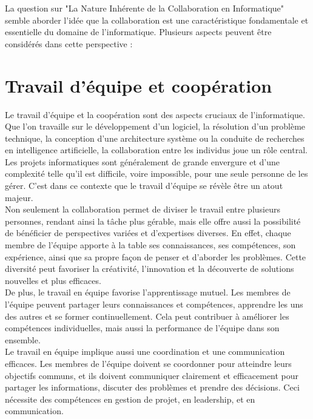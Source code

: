La question sur "La Nature Inhérente de la Collaboration en Informatique" semble aborder l'idée que la collaboration est une caractéristique fondamentale et essentielle du domaine de l'informatique. Plusieurs aspects peuvent être considérés dans cette perspective :

\section{Travail d'équipe et coopération} 
Le travail d'équipe et la coopération sont des aspects cruciaux de l'informatique. Que l'on travaille sur le développement d'un logiciel, la résolution d'un problème technique, la conception d'une architecture système ou la conduite de recherches en intelligence artificielle, la collaboration entre les individus joue un rôle central. \\

Les projets informatiques sont généralement de grande envergure et d'une complexité telle qu'il est difficile, voire impossible, pour une seule personne de les gérer. C'est dans ce contexte que le travail d'équipe se révèle être un atout majeur. \\

Non seulement la collaboration permet de diviser le travail entre plusieurs personnes, rendant ainsi la tâche plus gérable, mais elle offre aussi la possibilité de bénéficier de perspectives variées et d'expertises diverses. En effet, chaque membre de l'équipe apporte à la table ses connaissances, ses compétences, son expérience, ainsi que sa propre façon de penser et d'aborder les problèmes. Cette diversité peut favoriser la créativité, l'innovation et la découverte de solutions nouvelles et plus efficaces.\\

De plus, le travail en équipe favorise l'apprentissage mutuel. Les membres de l'équipe peuvent partager leurs connaissances et compétences, apprendre les uns des autres et se former continuellement. Cela peut contribuer à améliorer les compétences individuelles, mais aussi la performance de l'équipe dans son ensemble.\\

Le travail en équipe implique aussi une coordination et une communication efficaces. Les membres de l'équipe doivent se coordonner pour atteindre leurs objectifs communs, et ils doivent communiquer clairement et efficacement pour partager les informations, discuter des problèmes et prendre des décisions. Ceci nécessite des compétences en gestion de projet, en leadership, et en communication.\\

